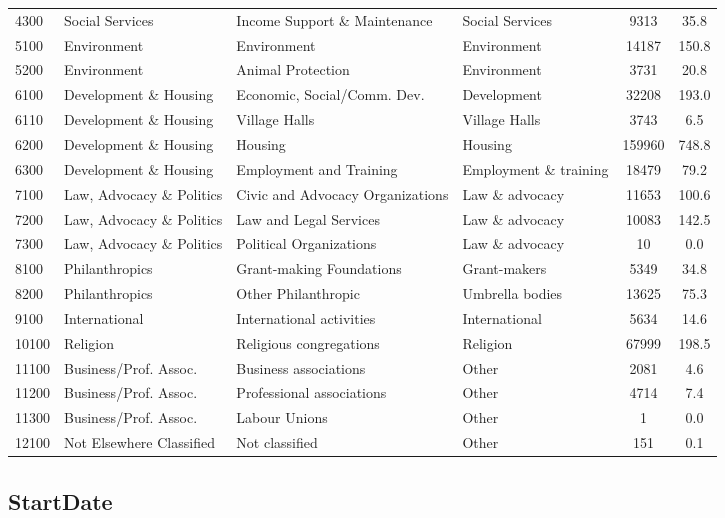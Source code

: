 \documentclass[11pt]{article}
\begin{document}
\begin{table}[!t]
\begin{tabular}{llllcc}
4300  & Social Services & Income Support \& Maintenance  & Social Services  & 9313 & 35.8 \\
5100  & Environment   & Environment  & Environment  & 14187  & 150.8   \\
5200  & Environment   & Animal Protection & Environment  & 3731 & 20.8 \\
6100  & Development \& Housing  & Economic, Social/Comm. Dev. & Development  & 32208  & 193.0   \\
6110  & Development \& Housing  & Village Halls   & Village Halls  & 3743 & 6.5  \\
6200  & Development \& Housing  & Housing  & Housing  & 159960 & 748.8   \\
6300  & Development \& Housing  & Employment and Training  & Employment \& training  & 18479  & 79.2 \\
7100  & Law, Advocacy \& Politics & Civic and Advocacy Organizations  & Law \& advocacy & 11653  & 100.6   \\
7200  & Law, Advocacy \& Politics & Law and Legal Services & Law \& advocacy & 10083  & 142.5   \\
7300  & Law, Advocacy \& Politics & Political Organizations  & Law \& advocacy & 10 & 0.0  \\
8100  & Philanthropics & Grant-making Foundations & Grant-makers   & 5349 & 34.8 \\
8200  & Philanthropics & Other Philanthropic  & Umbrella bodies  & 13625  & 75.3 \\
9100  & International & International activities & International  & 5634 & 14.6 \\
10100 & Religion & Religious congregations   & Religion   & 67999  & 198.5   \\
11100 & Business/Prof. Assoc.  & Business associations  & Other & 2081 & 4.6  \\
11200 & Business/Prof. Assoc.  & Professional associations  & Other & 4714 & 7.4  \\
11300 & Business/Prof. Assoc.  & Labour Unions   & Other & 1  & 0.0  \\
12100 & Not Elsewhere Classified & Not  classified & Other & 151  & 0.1 \\ \bottomrule
\end{tabular}
\end{table}

\subsection{StartDate}
\end{document}

